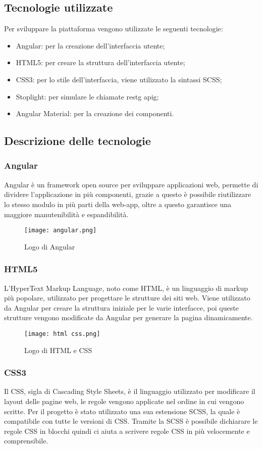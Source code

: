 \subsection{Tecnologie utilizzate}
Per sviluppare la piattaforma vengono utilizzate le seguenti tecnologie:
\begin{itemize}
    \item Angular: per la creazione dell'interfaccia utente;
    \item HTML5: per creare la struttura dell'interfaccia utente;
    \item CSS3: per lo stile dell'interfaccia, viene utilizzato la sintassi SCSS;
    \item Stoplight: per simulare le chiamate \gls{restg} \gls{apig};
    \item Angular Material: per la creazione dei componenti.
\end{itemize}
\subsection{Descrizione delle tecnologie}
\subsubsection{Angular}
Angular è un framework open source per sviluppare applicazioni web, permette di dividere l'applicazione in più componenti, grazie a questo è possibile riutilizzare lo stesso modulo in più parti della web-app, oltre a questo garantisce una maggiore manutenibilità e espandibilità.
\begin{figure}[H]
    \centering
    \texttt{[image: angular.png]}
    \caption{Logo di Angular}
\end{figure}
\subsubsection{HTML5}
L'HyperText Markup Language, noto come HTML, è un linguaggio di markup più popolare, utilizzato per progettare le strutture dei siti web. Viene utilizzato da Angular per creare la struttura iniziale per le varie interfacce, poi queste strutture vengono modificate da Angular per generare la pagina dinamicamente.
\begin{figure}[H]
    \centering
    \texttt{[image: html css.png]}
    \caption{Logo di HTML e CSS}
\end{figure}
\subsubsection{CSS3}
Il CSS, sigla di Cascading Style Sheets, è il linguaggio utilizzato per modificare il layout delle pagine web, le regole vengono applicate nel ordine in cui vengono scritte. Per il progetto è stato utilizzato una sua estensione SCSS, la quale è compatibile con tutte le versioni di CSS. Tramite la SCSS è possibile dichiarare le regole CSS in blocchi quindi ci aiuta a scrivere regole CSS in più velocemente e comprensibile.

